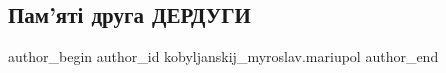  
 
 
 
 

\subsection{Пам'яті друга ДЕРДУГИ}
\label{sec:03_06_2023.fb.kobyljanskij_myroslav.mariupol.1.pamjati_druga_derdugy}

\ifcmt
 author_begin
   author_id kobyljanskij_myroslav.mariupol
 author_end
\fi

